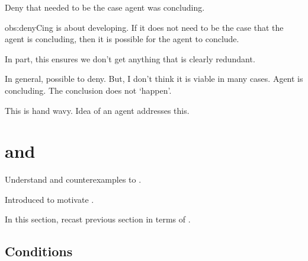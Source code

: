 \begin{note}
  \begin{observation}
    \label{obs:denyCing}
    Deny that needed to be the case agent was concluding.
  \end{observation}

  \begin{motivation}{obs:denyCing}
    \qWhyV{} is about developing.
    If it does not need to be the case that the agent is concluding, then it is possible for the agent to conclude.
  \end{motivation}

  In part, this ensures we don't get anything that is clearly redundant.

  In general, possible to deny.
  But, I don't think it is viable in many cases.
  Agent is concluding.
  The conclusion does not `happen'.

  This is hand wavy.
  Idea of an agent \tCV{} addresses this.
\end{note}

\section{ and \issueConstraint{}}
\label{sec:tpyically-concluding}

\begin{note}
  Understand \requ{} and counterexamples to \issueConstraint{}.

  Introduced \tCV{} to motivate \requ{}.

  In this section, recast previous section in terms of \tCV{}.
\end{note}

\subsection{Conditions}
\label{sec:conditions-1}


